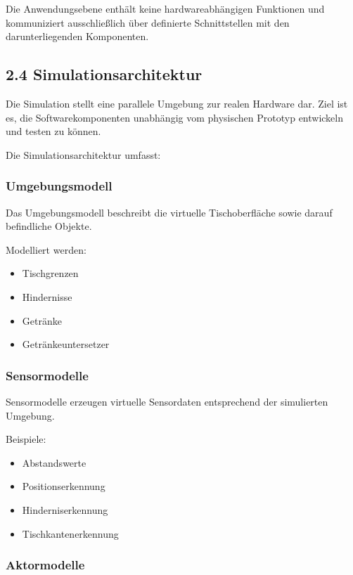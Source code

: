 \documentclass[
]{article}
\providecommand{\tightlist}{%
  \setlength{\itemsep}{0pt}\setlength{\parskip}{0pt}}
\begin{document}
Die Anwendungsebene enthält keine hardwareabhängigen Funktionen und
kommuniziert ausschließlich über definierte Schnittstellen mit den
darunterliegenden Komponenten.

\subsection{2.4 Simulationsarchitektur}\label{simulationsarchitektur}

Die Simulation stellt eine parallele Umgebung zur realen Hardware dar.
Ziel ist es, die Softwarekomponenten unabhängig vom physischen Prototyp
entwickeln und testen zu können.

Die Simulationsarchitektur umfasst:

\subsubsection{Umgebungsmodell}\label{umgebungsmodell}

Das Umgebungsmodell beschreibt die virtuelle Tischoberfläche sowie
darauf befindliche Objekte.

Modelliert werden:

\begin{itemize}
\tightlist
\item
  Tischgrenzen
\item
  Hindernisse
\item
  Getränke
\item
  Getränkeuntersetzer
\end{itemize}

\subsubsection{Sensormodelle}\label{sensormodelle}

Sensormodelle erzeugen virtuelle Sensordaten entsprechend der
simulierten Umgebung.

Beispiele:

\begin{itemize}
\tightlist
\item
  Abstandswerte
\item
  Positionserkennung
\item
  Hinderniserkennung
\item
  Tischkantenerkennung
\end{itemize}

\subsubsection{Aktormodelle}\label{aktormodelle}
\end{document}

